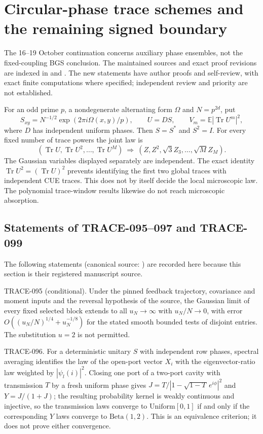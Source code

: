 \section{Circular-phase trace schemes and the remaining signed boundary}
\label{sec:phase-clusters-20261019}

The 16--19 October continuation concerns auxiliary phase ensembles, not
the fixed-coupling BGS conclusion.  The maintained sources and exact proof
revisions are indexed in
 and
.  The new statements have author
proofs and self-review, with exact finite computations where specified;
independent review and priority are not established.

For an odd prime $p$, a nondegenerate alternating form $\Omega$ and
$N=p^{2d}$, put
\[
 S_{xy}=N^{-1/2}\exp(2\pi i\Omega(x,y)/p),\qquad U=DS,
 \qquad V_m=\mathbb E|\operatorname{Tr}U^m|^2,
\]
where $D$ has independent uniform phases.  Then $S=S^*$ and $S^2=I$.
For every fixed number of trace powers the joint law is
\[
 (\operatorname{Tr}U,\operatorname{Tr}U^2,\ldots,
       \operatorname{Tr}U^M)
 \ \Longrightarrow\ (Z,Z^2,\sqrt3Z_3,\ldots,\sqrt M Z_M).
\]
The Gaussian variables displayed separately are independent.  The exact
identity $\operatorname{Tr}U^2=(\operatorname{Tr}U)^2$ prevents identifying
the first two global traces with independent CUE traces.  This does not
by itself decide the local microscopic law.  The polynomial trace-window
results likewise do not reach microscopic absorption.

\subsection{Statements of TRACE-095--097 and TRACE-099}

The following statements (canonical source:
) are recorded
here because this section is their registered manuscript source.

TRACE-095 (conditional). Under the pinned feedback trajectory, covariance
and moment inputs and the reversal hypothesis of the source, the Gaussian
limit of every fixed selected block extends to all $u_N\to\infty$ with
$u_N/N\to0$, with error $O((u_N/N)^{1/4}+u_N^{-1/8})$ for the stated
smooth bounded tests of disjoint entries. The substitution $u=2$ is not
permitted.

TRACE-096. For a deterministic unitary $S$ with independent row phases,
spectral averaging identifies the law of the open-port vector $X_i$ with
the eigenvector-ratio law weighted by $|\psi_l(i)|^2$. Closing one port
of a two-port cavity with transmission $T$ by a fresh uniform phase gives
$J=T/|1-\sqrt{1-T}\,e^{i\phi}|^2$ and $Y=J/(1+J)$; the resulting
probability kernel is weakly continuous and injective, so the transmission
laws converge to $\mathrm{Uniform}[0,1]$ if and only if the corresponding
$Y$ laws converge to $\mathrm{Beta}(1,2)$. This is an equivalence
criterion; it does not prove either convergence.

